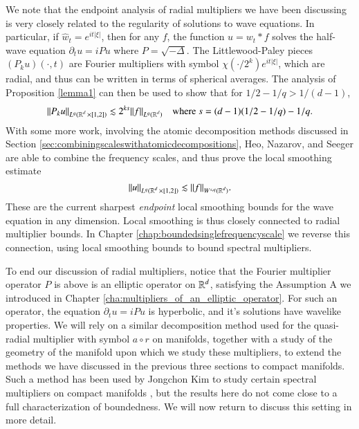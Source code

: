 We note that the endpoint analysis of radial multipliers we have been discussing is very closely related to the regularity of solutions to wave equations. In particular, if $\widehat{w}_t = e^{i t |\xi|}$, then for any $f$, the function $u = w_t * f$ solves the half-wave equation $\partial_t u = i P u$ where $P = \sqrt{-\Delta}$. The Littlewood-Paley pieces $(P_k u)(\cdot,t)$ are Fourier multipliers with symbol $\chi(\cdot / 2^k) e^{i t |\xi|}$, which are radial, and thus can be written in terms of spherical averages. The analysis of Proposition \ref{lemma1} can then be used to show that for $1/2 - 1/q > 1/(d-1)$,
%
\begin{equation}
  \| P_k u \|_{L^q( \operatorname{\mathbb{R}}^d \times [1,2] )} \lesssim 2^{k s} \| f \|_{L^q(\operatorname{\mathbb{R}}^d)}\quad\text{where}\ s = (d-1)(1/2 - 1/q) - 1/q.
\end{equation}
%
With some more work, involving the atomic decomposition methods discussed in Section \ref{sec:combiningscaleswithatomicdecompositions}, Heo, Nazarov, and Seeger are able to combine the frequency scales, and thus prove the local smoothing estimate
%
\begin{equation}
  \| u \|_{L^q(\operatorname{\mathbb{R}}^d \times [1,2])} \lesssim \| f \|_{W^{s,q}(\operatorname{\mathbb{R}}^d)}.
\end{equation}
%
These are the current sharpest \emph{endpoint} local smoothing bounds for the wave equation in any dimension. Local smoothing is thus closely connected to radial multiplier bounds. In Chapter \ref{chap:boundedsinglefrequencyscale} we reverse this connection, using local smoothing bounds to bound spectral multipliers.

To end our discussion of radial multipliers, notice that the Fourier multiplier operator $P$ is above is an elliptic operator on $\operatorname{\mathbb{R}}^d$, satisfying the Assumption A we introduced in Chapter \ref{cha:multipliers_of_an_elliptic_operator}. For such an operator, the equation $\partial_t u = i P u$ is hyperbolic, and it's solutions have wavelike properties. We will rely on a similar decomposition method used for the quasi-radial multiplier with symbol $a \circ r$ on manifolds, together with a study of the geometry of the manifold upon which we study these multipliers, to extend the methods we have discussed in the previous three sections to compact manifolds. Such a method has been used by Jongchon Kim to study certain spectral multipliers on compact manifolds \cite{KimSpectral}, but the results here do not come close to a full characterization of boundedness. We will now return to discuss this setting in more detail.








